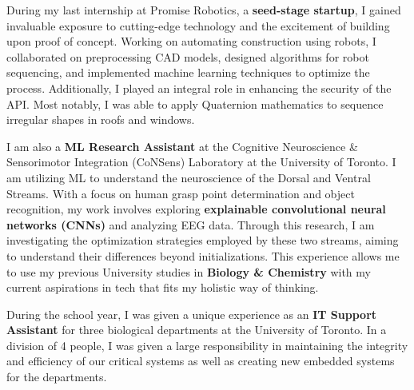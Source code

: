 \documentclass[10.5pt,a4]{article}
\begin{document}
During my last internship at Promise Robotics, a \textbf{seed-stage startup}, I gained invaluable exposure to cutting-edge technology and the excitement of building upon proof of concept. Working on automating construction using robots, I collaborated on preprocessing CAD models, designed algorithms for robot sequencing, and implemented machine learning techniques to optimize the process. Additionally, I played an integral role in enhancing the security of the API. Most notably, I was able to apply Quaternion mathematics to sequence irregular shapes in roofs and windows.

I am also a \textbf{ML Research Assistant} at the Cognitive Neuroscience \& Sensorimotor Integration (CoNSens) Laboratory at the University of Toronto. I am utilizing ML to understand the neuroscience of the Dorsal and Ventral Streams. With a focus on human grasp point determination and object recognition, my work involves exploring \textbf{explainable convolutional neural networks (CNNs)} and analyzing EEG data. Through this research, I am investigating the optimization strategies employed by these two streams, aiming to understand their differences beyond initializations. This experience allows me to use my previous University studies in \textbf{Biology \& Chemistry} with my current aspirations in tech that fits my holistic way of thinking. 

During the school year, I was given a unique experience as an \textbf{IT Support Assistant} for three biological departments at the University of Toronto. In a division of 4 people, I was given a large responsibility in maintaining the integrity and efficiency of our critical systems as well as creating new embedded systems for the departments. 
\end{document}
